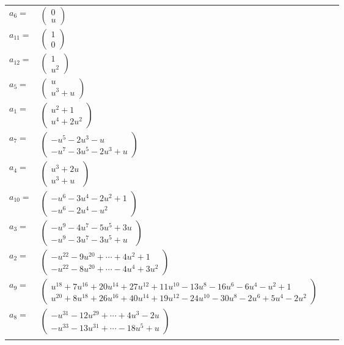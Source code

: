 \documentclass[1p]{elsarticle_modified}
\theoremstyle{definition}
\begin{document}
\begin{tabular}{m{7pt} m{180pt} m{7pt} m{180pt} }
\flushright $a_{6}=$&$\begin{pmatrix}0\\u\end{pmatrix}$ \\
\flushright $a_{11}=$&$\begin{pmatrix}1\\0\end{pmatrix}$ \\
\flushright $a_{12}=$&$\begin{pmatrix}1\\u^2\end{pmatrix}$ \\
\flushright $a_{5}=$&$\begin{pmatrix}u\\u^3+u\end{pmatrix}$ \\
\flushright $a_{1}=$&$\begin{pmatrix}u^2+1\\u^4+2 u^2\end{pmatrix}$ \\
\flushright $a_{7}=$&$\begin{pmatrix}- u^5-2 u^3- u\\- u^7-3 u^5-2 u^3+u\end{pmatrix}$ \\
\flushright $a_{4}=$&$\begin{pmatrix}u^3+2 u\\u^3+u\end{pmatrix}$ \\
\flushright $a_{10}=$&$\begin{pmatrix}- u^6-3 u^4-2 u^2+1\\- u^6-2 u^4- u^2\end{pmatrix}$ \\
\flushright $a_{3}=$&$\begin{pmatrix}- u^9-4 u^7-5 u^5+3 u\\- u^9-3 u^7-3 u^5+u\end{pmatrix}$ \\
\flushright $a_{2}=$&$\begin{pmatrix}- u^{22}-9 u^{20}+\cdots+4 u^2+1\\- u^{22}-8 u^{20}+\cdots-4 u^4+3 u^2\end{pmatrix}$ \\
\flushright $a_{9}=$&$\begin{pmatrix}u^{18}+7 u^{16}+20 u^{14}+27 u^{12}+11 u^{10}-13 u^8-16 u^6-6 u^4- u^2+1\\u^{20}+8 u^{18}+26 u^{16}+40 u^{14}+19 u^{12}-24 u^{10}-30 u^8-2 u^6+5 u^4-2 u^2\end{pmatrix}$ \\
\flushright $a_{8}=$&$\begin{pmatrix}- u^{31}-12 u^{29}+\cdots+4 u^3-2 u\\- u^{33}-13 u^{31}+\cdots-18 u^5+u\end{pmatrix}$\\&\end{tabular}
\end{document}
